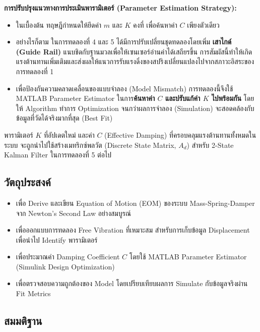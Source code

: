 \textbf{การปรับปรุงแนวทางการประเมินพารามิเตอร์ (Parameter Estimation Strategy):}
\begin{itemize}
    \item ในเบื้องต้น ทฤษฎีกำหนดให้ยึดค่า $m$ และ $K$ คงที่ เพื่อค้นหาค่า $C$ เพียงตัวเดียว
    \item อย่างไรก็ตาม ในการทดลองที่ 4 และ 5 ได้มีการปรับเปลี่ยนชุดทดลองโดยเพิ่ม \textbf{เสาไกด์ (Guide Rail)} แนบชิดกับฐานมวลเพื่อให้เซนเซอร์อ่านค่าได้เสถียรขึ้น การสัมผัสนี้ทำให้เกิดแรงต้านทานเพิ่มเติมและส่งผลให้แนวการรับแรงดิ่งของสปริงเปลี่ยนแปลงไปจากสภาวะอิสระของการทดลองที่ 1
    \item เพื่อป้องกันความคลาดเคลื่อนของแบบจำลอง (Model Mismatch) การทดลองนี้จึงใช้ MATLAB Parameter Estimator ในการ\textbf{ค้นหาค่า $C$ และปรับแก้ค่า $K$ ไปพร้อมกัน} โดยให้ Algorithm ทำการ Optimization จนกว่าผลการจำลอง (Simulation) จะสอดคล้องกับข้อมูลที่วัดได้จริงมากที่สุด (Best Fit)
\end{itemize}

พารามิเตอร์ $K$ ที่อัปเดตใหม่ และค่า $C$ (Effective Damping) ที่ครอบคลุมแรงต้านทานทั้งหมดในระบบ จะถูกนำไปใช้สร้างเมทริกซ์พลวัต (Discrete State Matrix, $A_d$) สำหรับ 2-State Kalman Filter ในการทดลองที่ 5 ต่อไป
\subsection{วัตถุประสงค์}

\begin{itemize}
    \item เพื่อ Derive และเขียน Equation of Motion (EOM) ของระบบ
          Mass-Spring-Damper จาก Newton's Second Law อย่างสมบูรณ์
    \item เพื่อออกแบบการทดลอง Free Vibration ที่เหมาะสม
          สำหรับการเก็บข้อมูล Displacement เพื่อนำไป Identify พารามิเตอร์
    \item เพื่อประมาณค่า Damping Coefficient $C$ โดยใช้
          MATLAB Parameter Estimator (Simulink Design Optimization)
    \item เพื่อตรวจสอบความถูกต้องของ Model โดยเปรียบเทียบผลการ Simulate
          กับข้อมูลจริงผ่าน Fit Metrics
\end{itemize}

\subsection{สมมติฐาน}

